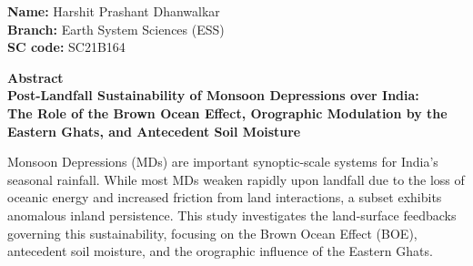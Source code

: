 \documentclass[12pt]{article}
\begin{document}
\begin{flushleft}
	\textbf{Name:} Harshit Prashant Dhanwalkar \\
	\textbf{Branch:} Earth System Sciences (ESS) \\
	\textbf{SC code:} SC21B164 \\
\end{flushleft}

\vspace{1cm}

\begin{center}
	\Large \textbf{Abstract} \\
	\vspace{0.5cm}
	\large \textbf{Post-Landfall Sustainability of Monsoon Depressions over India: \\
		The Role of the Brown Ocean Effect, %
		Orographic Modulation by the Eastern Ghats, %
		and Antecedent Soil Moisture}

\end{center}

\vspace{0.5cm}

\noindent Monsoon Depressions (MDs) are important synoptic-scale systems for India's seasonal rainfall. While most MDs weaken rapidly upon landfall due to the loss of oceanic energy and increased friction from land interactions, a subset exhibits anomalous inland persistence. This study investigates the land-surface feedbacks governing this sustainability, focusing on the Brown Ocean Effect (BOE), antecedent soil moisture, and the orographic influence of the Eastern Ghats.

\vspace{0.3cm}
\end{document}
